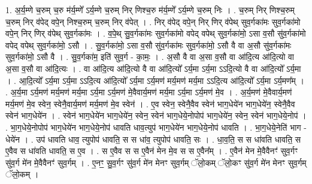 \documentclass[17pt]{extarticle}
\begin{document}
1. अ॒र्य॒म्णे च॒रुम् च॒रु म॑र्य॒म्णे᳚ ऽर्य॒म्णे च॒रुम् निर् णिश्च॒रु म॑र्य॒म्णे᳚ ऽर्य॒म्णे च॒रुम् निः । . च॒रुम् निर् णिश्च॒रुम् च॒रुम् निर् व॑पेद् वपे॒न् निश्च॒रुम् च॒रुम् निर् व॑पेत् । . निर् व॑पेद् वपे॒न् निर् णिर् व॑पेथ् सुव॒र्गका॑मः सुव॒र्गका॑मो वपे॒न् निर् णिर् व॑पेथ् सुव॒र्गका॑मः । . व॒पे॒थ् सु॒व॒र्गका॑मः सुव॒र्गका॑मो वपेद् वपेथ् सुव॒र्गका॑मो॒ ऽसा व॒सौ सु॑व॒र्गका॑मो वपेद् वपेथ् सुव॒र्गका॑मो॒ ऽसौ । . सु॒व॒र्गका॑मो॒ ऽसा व॒सौ सु॑व॒र्गका॑मः सुव॒र्गका॑मो॒ ऽसौ वै वा अ॒सौ सु॑व॒र्गका॑मः सुव॒र्गका॑मो॒ ऽसौ वै । . सु॒व॒र्गका॑म॒ इति॑ सुव॒र्ग - का॒मः॒ । . अ॒सौ वै वा अ॒सा व॒सौ वा आ॑दि॒त्य आ॑दि॒त्यो वा अ॒सा व॒सौ वा आ॑दि॒त्यः । . वा आ॑दि॒त्य आ॑दि॒त्यो वै वा आ॑दि॒त्यो᳚ ऽर्य॒मा ऽर्य॒मा ऽऽदि॒त्यो वै वा आ॑दि॒त्यो᳚ ऽर्य॒मा । . आ॒दि॒त्यो᳚ ऽर्य॒मा ऽर्य॒मा ऽऽदि॒त्य आ॑दि॒त्यो᳚ ऽर्य॒मा ऽर्य॒मण॑ मर्य॒मण॑ मर्य॒मा ऽऽदि॒त्य आ॑दि॒त्यो᳚ ऽर्य॒मा ऽर्य॒मण᳚म् । . अ॒र्य॒मा ऽर्य॒मण॑ मर्य॒मण॑ मर्य॒मा ऽर्य॒मा ऽर्य॒मण॑ मे॒वैवार्य॒मण॑ मर्य॒मा ऽर्य॒मा ऽर्य॒मण॑ मे॒व । . अ॒र्य॒मण॑ मे॒वैवार्य॒मण॑ मर्य॒मण॑ मे॒व स्वेन॒ स्वेनै॒वार्य॒मण॑ मर्य॒मण॑ मे॒व स्वेन॑ । . ए॒व स्वेन॒ स्वेनै॒वैव स्वेन॑ भाग॒धेये॑न भाग॒धेये॑न॒ स्वेनै॒वैव स्वेन॑ भाग॒धेये॑न । . स्वेन॑ भाग॒धेये॑न भाग॒धेये॑न॒ स्वेन॒ स्वेन॑ भाग॒धेये॒नोपोप॑ भाग॒धेये॑न॒ स्वेन॒ स्वेन॑ भाग॒धेये॒नोप॑ । . भा॒ग॒धेये॒नोपोप॑ भाग॒धेये॑न भाग॒धेये॒नोप॑ धावति धाव॒त्युप॑ भाग॒धेये॑न भाग॒धेये॒नोप॑ धावति । . भा॒ग॒धेये॒नेति॑ भाग - धेये॑न । . उप॑ धावति धाव॒ त्युपोप॑ धावति॒ स स धा॑व॒ त्युपोप॑ धावति॒ सः । . धा॒व॒ति॒ स स धा॑वति धावति॒ स ए॒वैव स धा॑वति धावति॒ स ए॒व । . स ए॒वैव स स ए॒वैन॑ मेन मे॒व स स ए॒वैन᳚म् । . ए॒वैन॑ मेन मे॒वैवैनꣳ॑ सुव॒र्गꣳ सु॑व॒र्ग मे॑न मे॒वैवैनꣳ॑ सुव॒र्गम् । . ए॒नꣳ॒॒ सु॒व॒र्गꣳ सु॑व॒र्ग मे॑न मेनꣳ सुव॒र्गम् ॅलो॒कम् ॅलो॒कꣳ सु॑व॒र्ग मे॑न मेनꣳ सुव॒र्गम् ॅलो॒कम् । \newline
\end{document}
